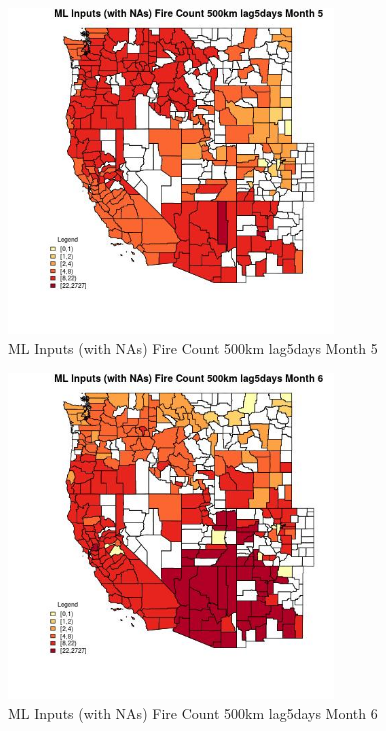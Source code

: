 \clearpage 

\begin{figure} 
\centering  
\includegraphics[width=0.77\textwidth]{Code_Outputs/Report_ML_input_PM25_Step4_part_f_de_duplicated_aveswNAs_CountyFire_Count_500km_lag5daysmedianMonth5.jpg} 
\caption{\label{fig:Report_ML_input_PM25_Step4_part_f_de_duplicated_aveswNAsCountyFire_Count_500km_lag5daysmedianMonth5}ML Inputs (with NAs) Fire Count 500km lag5days Month 5} 
\end{figure} 
 

\begin{figure} 
\centering  
\includegraphics[width=0.77\textwidth]{Code_Outputs/Report_ML_input_PM25_Step4_part_f_de_duplicated_aveswNAs_CountyFire_Count_500km_lag5daysmedianMonth6.jpg} 
\caption{\label{fig:Report_ML_input_PM25_Step4_part_f_de_duplicated_aveswNAsCountyFire_Count_500km_lag5daysmedianMonth6}ML Inputs (with NAs) Fire Count 500km lag5days Month 6} 
\end{figure} 
 

